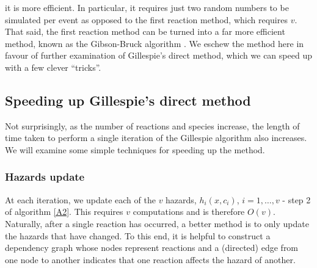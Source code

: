 \documentclass[12pt, DIV12]{scrartcl}
\begin{document}
it is more efficient. In particular, it requires just two random numbers to be
simulated per event as opposed to the first reaction method, which requires $v$.
That said, the first reaction method can be turned into a far more efficient
method, known as the Gibson-Bruck algorithm \citep{GB2000}. We eschew the method
here in favour of further examination of Gillespie's direct method, which we can
speed up with a few clever ``tricks''.


\subsection{Speeding up Gillespie's direct method}\label{speed}

Not surprisingly, as the number of reactions and species increase, the length of
time taken to perform a single iteration of the Gillespie algorithm also
increases. We will examine some simple techniques for speeding up the method.

\subsubsection{Hazards update}

At each iteration, we update each of the $v$ hazards, $h_{i}(x,c_{i})$,
$i=1,\ldots ,v$ - step 2 of algorithm \ref{A2}. This requires $v$ computations
and is therefore $O(v)$. Naturally, after a single reaction has occurred, a
better method is to only update the hazards that have changed. To this end, it
is helpful to construct a dependency graph whose nodes represent reactions and a
(directed) edge from one node to another indicates that one reaction affects the
hazard of another.
\end{document}
